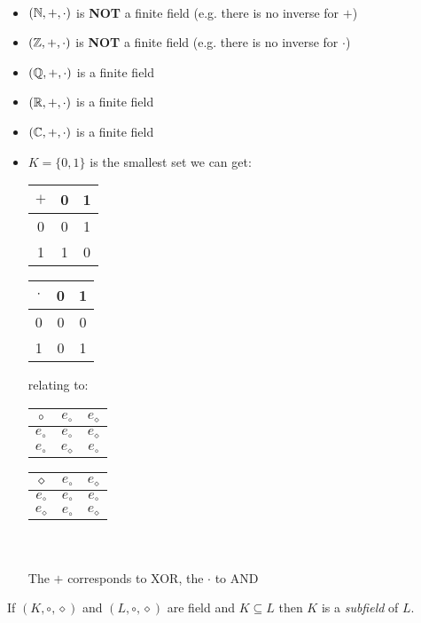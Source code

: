 \begin{example} \ \\
\begin{itemize}
\item $(\mathbb{N}, +, \cdot)$ is \textbf{NOT} a finite field (e.g. there is no inverse for $+$)
\item $(\mathbb{Z}, +, \cdot)$ is \textbf{NOT} a finite field (e.g. there is no inverse for $\cdot$)
\item $(\mathbb{Q}, +, \cdot)$ is a finite field
\item $(\mathbb{R}, +, \cdot)$ is a finite field
\item $(\mathbb{C}, +, \cdot)$ is a finite field
\item $K = \{0,1\}$ is the smallest set we can get: \\

\bgroup
\def\arraystretch{1.5}
\begin{tabular}{c|cc}
$+$ &  0 & 1 \\
\hline 
0 & 0 & 1  \\
1 & 1 & 0 \\
\end{tabular} \hfill
\begin{tabular}{c|cc}
$\cdot$ &  0 & 1 \\
\hline 
0 & 0 & 0  \\
1 & 0 & 1 \\
\end{tabular} \hfill
relating to: \hfill
\begin{tabular}{c|cc}
$\circ$ &  $e_{\circ}$ & $e_{\diamond}$ \\
\hline 
$e_{\circ}$ & $e_{\circ}$ & $e_{\diamond}$  \\
$e_{\circ}$ & $e_{\diamond}$ & $e_{\circ}$ \\
\end{tabular} \hfill
\begin{tabular}{c|cc}
$\diamond$ &  $e_{\circ}$ & $e_{\diamond}$ \\
\hline 
$e_{\circ}$ & $e_{\circ}$ & $e_{\circ}$  \\
$e_{\diamond}$ & $e_{\circ}$ & $e_{\diamond}$ \\
\end{tabular}
\egroup \\ \\
The $+$ corresponds to \textsc{XOR}, the $\cdot$ to \textsc{AND}
\end{itemize}
\end{example}

\begin{definition}[Subfield]
If $(K, \circ, \diamond)$ and $(L,\circ, \diamond)$ are field and $K \subseteq L$ then $K$ is a \emph{subfield} of $L$.
\end{definition}

